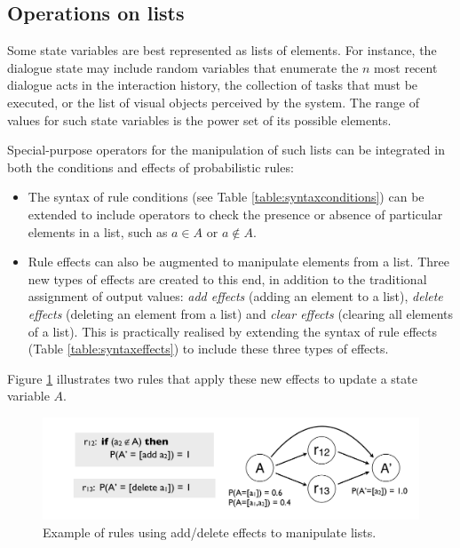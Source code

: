 \subsection{Operations on lists}

Some state variables are best represented as lists of elements. For instance, the dialogue state may include random variables that enumerate  the $n$ most recent dialogue acts in the interaction history, the collection of tasks that must be executed, or the list of visual objects perceived by the system.  The range of values for such state variables is the power set of its possible elements. 

Special-purpose operators for the manipulation of such lists can be integrated in both the conditions and effects of probabilistic rules: 
\begin{itemize}
\item The syntax of rule conditions (see Table \ref{table:syntaxconditions}) can be extended to include operators to check the presence or absence of particular elements in a list, such as $a \in A$ or $a \notin A$. 
\item Rule effects can also be augmented to manipulate elements from a list.  Three new types of effects are created to this end, in addition to the traditional assignment of output values: \textit{add effects} (adding an element to a list), \textit{delete effects} (deleting an element from a list) and \textit{clear effects} (clearing all elements of a list). This is practically realised by extending the syntax of rule effects (Table \ref{table:syntaxeffects}) to include these three types of effects. 
\end{itemize}

Figure \ref{fig:seteffects} illustrates two rules that apply these new effects to update a state variable $A$. 
 
\begin{figure}[ht]
\centering
\includegraphics[scale=0.25]{imgs/seteffects.pdf}
\caption{Example of rules using add/delete effects to manipulate lists.}
\label{fig:seteffects}
\end{figure}

